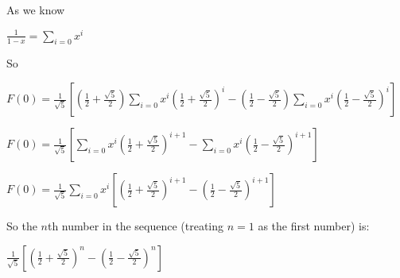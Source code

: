 As we know

$\frac{1}{1-x}=\sum_{i=0}x^i $

So

$F(0)=\frac{1}{\sqrt 5}[(\frac{1}{2}+\frac{\sqrt 5}{2})\sum_{i=0} x^i(\frac{1}{2}+\frac{\sqrt 5}{2})^i -(\frac{1}{2}-\frac{\sqrt 5}{2})\sum_{i=0}x^i(\frac{1}{2}-\frac{\sqrt 5}{2})^i]$

$F(0)=\frac{1}{\sqrt 5}[\sum_{i=0} x^i(\frac{1}{2}+\frac{\sqrt 5}{2})^{i+1} -\sum_{i=0}x^i(\frac{1}{2}-\frac{\sqrt 5}{2})^{i+1}]$

$F(0)=\frac{1}{\sqrt 5}\sum_{i=0} x^i[(\frac{1}{2}+\frac{\sqrt 5}{2})^{i+1} -(\frac{1}{2}-\frac{\sqrt 5}{2})^{i+1}]$

So the \(n\)th number in the sequence (treating \(n=1\) as the first number) is:

$\frac{1}{\sqrt 5}[(\frac{1}{2}+\frac{\sqrt 5}{2})^{n} -(\frac{1}{2}-\frac{\sqrt 5}{2})^{n}]$

